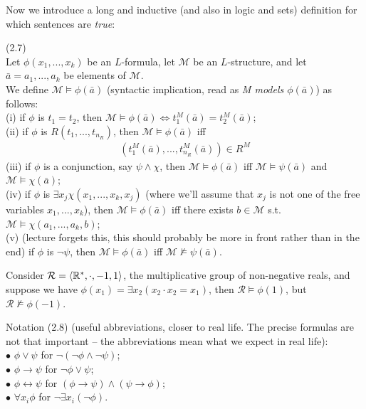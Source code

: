 \documentclass[a4paper]{article}
\begin{document}
Now we introduce a long and inductive (and also in logic and sets) definition for which sentences are \emph{true}:
\begin{defi} (2.7)\\
    Let $\phi(x_1,...,x_k)$ be an $L$-formula, let $\mathcal{M}$ be an $L$-structure, and let $\bar{a} = a_1,...,a_k$ be elements of $\mathcal{M}$.\\
    We define $\mathcal{M} \vDash \phi(\bar{a})$ (syntactic implication, read as \emph{M models $\phi(\bar{a})$}) as follows:\\
    (i) if $\phi$ is $t_1=t_2$, then $\mathcal{M} \vDash \phi(\bar{a}) \iff t_1^M(\bar{a}) = t_2^M(\bar{a})$;\\
    (ii) if $\phi$ is $R(t_1,...,t_{n_R})$, then $\mathcal{M} \vDash \phi(\bar{a})$ iff
    \begin{equation*}
        \begin{aligned}
            \left(t_1^M(\bar{a}),...,t_{n_R}^M(\bar{a})\right) \in R^M
        \end{aligned}
    \end{equation*}
    (iii) if $\phi$ is a conjunction, say $\psi \wedge \chi$, then $\mathcal{M} \vDash \phi(\bar{a})$ iff $\mathcal{M} \vDash \psi(\bar{a})$ and $\mathcal{M} \vDash \chi(\bar{a})$;\\
    (iv) if $\phi$ is $\exists x_j \chi(x_1,...,x_k,x_j)$ (where we'll assume that $x_j$ is not one of the free variables $x_1,...,x_k$), then $\mathcal{M} \vDash \phi(\bar{a})$ iff there exists $b \in \mathcal{M}$ s.t. $\mathcal{M} \vDash \chi(a_1,...,a_k,b)$;\\
    (v) (lecture forgets this, this should probably be more in front rather than in the end) if $\phi$ is $\neg \psi$, then $\mathcal{M} \vDash \phi(\bar{a})$ iff $\mathcal{M} \not\vDash \psi(\bar{a})$.
\end{defi}

\begin{eg}
    Consider $\mathcal{R} = \langle \mathbb{R}^*,\cdot ,-1,1\rangle$, the multiplicative group of non-negative reals, and suppose we have $\phi(x_1) = \exists x_2 (x_2 \cdot x_2 = x_1)$, then $\mathcal{R} \vDash \phi(1)$, but $\mathcal{R} \not\vDash \phi(-1)$.
\end{eg}

Notation (2.8) (useful abbreviations, closer to real life. The precise formulas are not that important -- the abbreviations mean what we expect in real life):\\
$\bullet$ $\phi \vee \psi$ for $\neg(\neg\phi \wedge \neg \psi)$;\\
$\bullet$ $\phi \to \psi$ for $\neg \phi \vee \psi$;\\
$\bullet$ $\phi \leftrightarrow \psi$ for $(\phi \to \psi) \wedge (\psi \to \phi)$;\\
$\bullet$ $\forall x_i \phi$ for $\neg \exists x_i (\neg \phi)$.
\end{document}
